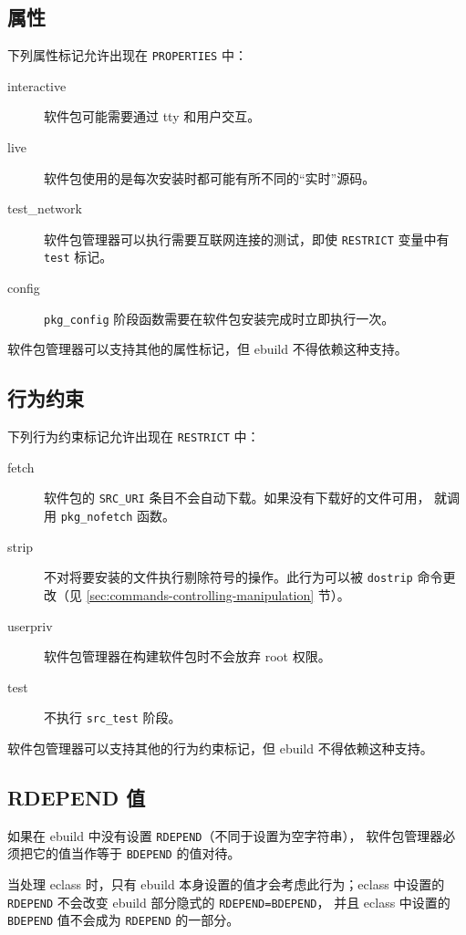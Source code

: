 \subsection{属性}
\label{sec:properties}

下列属性标记允许出现在 \texttt{PROPERTIES} 中：
\begin{description}
\item[interactive] 软件包可能需要通过 tty 和用户交互。
\item[live] 软件包使用的是每次安装时都可能有所不同的“实时”源码。
\item[test_network] 软件包管理器可以执行需要互联网连接的测试，即使
    \texttt{RESTRICT} 变量中有 \texttt{test} 标记。
\item[config] \texttt{pkg_config} 阶段函数需要在软件包安装完成时立即执行一次。
\end{description}

软件包管理器可以支持其他的属性标记，但 ebuild 不得依赖这种支持。

\subsection{行为约束}
\label{sec:restrict}

下列行为约束标记允许出现在 \texttt{RESTRICT} 中：
\begin{description}
\item[fetch] 软件包的 \texttt{SRC_URI} 条目不会自动下载。如果没有下载好的文件可用，
    就调用 \texttt{pkg_nofetch} 函数。
\item[strip] 不对将要安装的文件执行剔除符号的操作。此行为可以被 \texttt{dostrip}
    命令更改（见 \ref{sec:commands-controlling-manipulation} 节）。
\item[userpriv] 软件包管理器在构建软件包时不会放弃 root 权限。
\item[test] 不执行 \texttt{src_test} 阶段。
\end{description}

软件包管理器可以支持其他的行为约束标记，但 ebuild 不得依赖这种支持。

\subsection{RDEPEND 值}
\label{sec:rdepend-depend}

如果在 ebuild 中没有设置 \texttt{RDEPEND}（不同于设置为空字符串），
软件包管理器必须把它的值当作等于 \texttt{BDEPEND} 的值对待。

当处理 eclass 时，只有 ebuild 本身设置的值才会考虑此行为；eclass 中设置的
\texttt{RDEPEND} 不会改变 ebuild 部分隐式的 \texttt{RDEPEND=BDEPEND}，
并且 eclass 中设置的 \texttt{BDEPEND} 值不会成为 \texttt{RDEPEND} 的一部分。

